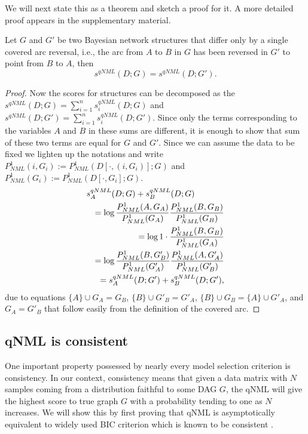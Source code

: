 We will next state this as a
theorem and sketch a proof for it. A more detailed proof appears in the
supplementary material.
\begin{theorem}
  \label{thm:scoreqv}
  Let $G$ and $G'$ be two Bayesian network structures that differ only
  by a single covered arc reversal, i.e., the arc from $A$ to $B$ in $G$
  has been reversed in $G'$ to point from $B$ to $A$, then
  $$s^{qNML}(D;G)=s^{qNML}(D;G').$$
\end{theorem}
\begin{proof}
  Now the scores for structures can be decomposed as the
  $s^{qNML}(D;G)=\sum_{i=1}^{n}s_i^{qNML}(D;G)$ and
  $s^{qNML}(D;G')=\sum_{i=1}^{n}s_i^{qNML}(D;G')$.  Since only the
  terms corresponding to the variables $A$ and $B$ in these sums are
  different, it is enough to show that sum of these two terms are
  equal for $G$ and $G'$. Since we can assume the data to be fixed we
  lighten up the notations and write
  $P^1_{NML}(i,G_i) := P^1_{NML}(D[\cdot,(i,G_i)];G)$ and
  $P^1_{NML}(G_i)   := P^1_{NML}(D[\cdot,G_i];G)$.
  \begin{eqnarray}
    \lefteqn{s_A^{qNML}(D;G)+s_B^{qNML}(D;G)} \nonumber\\
    && =\log\frac{P^1_{NML}(A,G_{A})}{P^1_{NML}(G_{A})}
            \frac{P^1_{NML}(B,G_{B})}{P^1_{NML}(G_{B})}\nonumber\\
    && =\log 1\cdot\frac{P^1_{NML}(B,G_{B})}{P^1_{NML}(G_{A})}\nonumber\\
    && =\log \frac{P^1_{NML}(B,G'_{B})}{P^1_{NML}(G'_{A})}
             \frac{P^1_{NML}(A,G'_{A})}{P^1_{NML}(G'_{B})}\nonumber\\
 && =s_A^{qNML}(D;G')+s_B^{qNML}(D;G'),\nonumber
\end{eqnarray}
  due to equations $\{A\}\cup G_A = G_B$, $\{B\}\cup G'_B = G'_A$,
  $\{B\}\cup G_B = \{A\} \cup G'_A$, and $G_A = G'_B$ that follow
  easily from the definition of the covered arc.
\end{proof}

\subsection{qNML is consistent}

One important property possessed by nearly every model selection
criterion is consistency. In our context, consistency means that given
a data matrix with $N$ samples coming from a distribution faithful to
some DAG $G$, the qNML will give the highest score to true graph $G$
with a probability tending to one as $N$ increases. We will show this
by first proving that qNML is asymptotically equivalent to widely used
BIC criterion which is known to be consistent \cite{Schw78, Haug88}.

